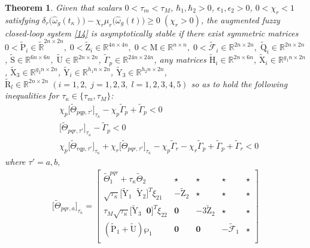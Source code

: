 \documentclass[preprint,11pt]{elsarticle}
\newtheorem{Thm}{Theorem}
\begin{document}
\begin{Thm}\label{Thm2}
Given that scalars $0<\tau_m<\tau_M$, $\hbar_1,\hbar_2>0$, $\epsilon_1,\epsilon_2>0$, {$0<\chi_r< 1$} satisfying {$\delta_r\big(\hat{\omega}_g(t_\kappa)\big)-\chi_r\mu_r\big(\hat{\omega}_g(t)\big)\geq 0\;(\chi_r>0)$}, the augmented fuzzy closed-loop system \eqref{14} is asymptotically stable if there exist symmetric matrices $0<\mathrm{\tilde{P}}_i\in  \mathbb{\tilde{R}}^{2n\times 2n},\; 0<\mathrm{\tilde{Z}}_i\in  \mathbb{R}^{4n\times4n}, \;0<\mathrm{M}\in  \mathbb{R}^{n\times n}, \; 0<{\tilde{\mathcal{F}}_i}\in  \mathbb{R}^{2n\times 2n},\;\mathrm{\tilde{Q}}_i\in  \mathbb{R}^{2n\times 2n}$, $\mathrm{\tilde{S}}\in  \mathbb{R}^{6n\times 6n},\;\mathrm{\tilde{U}}\in  \mathbb{R}^{2n\times 2n}$, $\tilde{\Gamma}_p\in  \mathbb{R}^{24n\times 24n}$, any matrices $ \mathrm{\tilde{H}}_i\in  \mathbb{R}^{2n\times 6n}$,
$ \mathrm{\tilde{X}}_i\in  \mathbb{R}^{g_1n\times 2n}$, $ \mathrm{\tilde{X}}_3\in  \mathbb{R}^{g_2n\times 2n}$,
$ \mathrm{\tilde{Y}}_i\in  \mathbb{R}^{h_1n\times 2n}$, $ \mathrm{\tilde{Y}}_3\in  \mathbb{R}^{h_2n\times 2n}$,
$\mathrm{\tilde{R}}_l\in  \mathbb{R}^{2n\times 2n}\;(i=1,2,\;j=1,2,3,\;l=1,2,3,4,5)$ so as to hold the following inequalities for $\tau_\kappa\in\{ \tau_m,\tau_M \}$:
\begin{align}
&\chi_p\big[ \tilde{\Theta}_{pqp,\tau'}\big]_{\tau_\kappa} -\chi_p\tilde{\Gamma}_p+ \tilde{\Gamma}_p<0\label{44}\\
& \big[ \tilde{\Theta}_{pqr,\tau'}\big]_{\tau_\kappa} - \tilde{\Gamma}_p<0\label{45}\\
&\chi_p\big[ \tilde{\Theta}_{rqp,\tau'}\big]_{\tau_\kappa}+\chi_r\big[\tilde{\Theta}_{pqr,\tau'}\big]_{\tau_\kappa}
 - \chi_p\tilde{\Gamma}_r- \chi_r\tilde{\Gamma}_p+\tilde{\Gamma}_p+\tilde{\Gamma}_r<0\label{49}
\end{align}
where $\tau'=a,b,$
\begin{align*}
\big[ \tilde{\Theta}_{pqr,a}\big]_{\tau_\kappa}=
 \begin{bmatrix}
 \tilde{\Theta}_1^{pqr}+\tau_\kappa\tilde{\Theta}_2& \star&\star&\star&\star\\
 \sqrt{\tau_\kappa}\big[ \mathrm{\tilde{Y}}_1\;\;\mathrm{\tilde{Y}}_2 \big]^T\xi_{21}&-\mathrm{\tilde{Z}}_2&\star&\star&\star\\
 \tau_M \sqrt{\tau_\kappa}\big[ \mathrm{\tilde{Y}}_3\;\;\mathbf{0} \big]^T\xi_{22}&\mathbf{0}&-3\mathrm{\tilde{Z}}_2&\star&\star\\
 (\mathrm{\tilde{P}}_1+\mathrm{\tilde{U}})\wp_1&\mathbf{0}&\mathbf{0}&-{\tilde{\mathcal{F}}_1}&\star\\

\end{bmatrix}
\end{align*}
\end{Thm}
\end{document}
